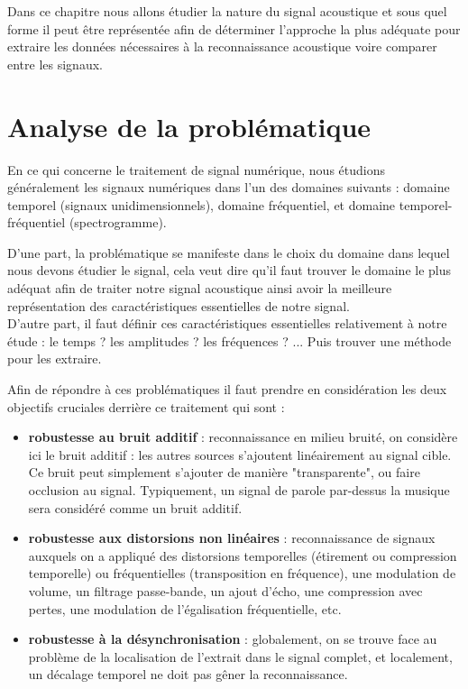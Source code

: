\documentclass[11pt, report, french]{scrreprt}
\begin{document}
Dans ce chapitre nous allons étudier la nature du signal acoustique et sous quel forme il peut être représentée afin de déterminer l'approche la plus adéquate pour extraire les données nécessaires à la reconnaissance acoustique voire comparer entre les signaux.
\section{Analyse de la problématique}
En ce qui concerne le traitement de signal numérique, nous étudions généralement les signaux numériques dans l'un des domaines suivants : domaine temporel (signaux unidimensionnels), domaine fréquentiel, et domaine temporel-fréquentiel (spectrogramme).\\\par
D'une part, la problématique se manifeste dans le choix du domaine dans lequel nous devons étudier le signal, cela veut dire qu'il faut trouver le domaine le plus adéquat afin de traiter notre signal acoustique ainsi avoir la meilleure représentation des caractéristiques essentielles de notre signal.\\
D'autre part, il faut définir ces caractéristiques essentielles relativement à notre étude : le temps ? les amplitudes ? les fréquences ? ...
Puis trouver une méthode pour les extraire.\\\par
Afin de répondre à ces problématiques il faut prendre en considération les deux objectifs cruciales derrière ce traitement qui sont :\\

\begin{itemize}
	\item 	\textbf{robustesse au bruit additif} : reconnaissance en milieu bruité, on considère ici le bruit additif : les autres sources s’ajoutent linéairement au signal cible. Ce bruit peut simplement s’ajouter de manière "transparente", ou faire occlusion au signal. Typiquement, un signal de parole par-dessus la musique sera considéré comme un bruit additif.
	\item 	\textbf{robustesse aux distorsions non linéaires} : reconnaissance de signaux auxquels on a appliqué des distorsions temporelles (étirement ou compression temporelle) ou fréquentielles (transposition en fréquence), une modulation de volume, un filtrage passe-bande, un ajout d’écho, une compression avec pertes, une modulation de l’égalisation fréquentielle, etc.
	\item 	\textbf{robustesse à la désynchronisation} : globalement, on se trouve face au problème de la localisation de l’extrait dans le signal complet, et localement, un décalage temporel ne doit pas gêner la reconnaissance.
\end{itemize}
\end{document}
